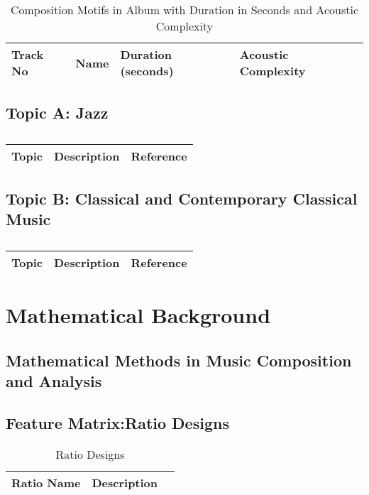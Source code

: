 \begin{table}[H]
	\caption{Composition Motifs in Album with Duration in Seconds and Acoustic Complexity}	
	\begin{tabular}{p{1cm}p{4cm}p{2cm}p{2cm}}
	\hline
	Track No & Name & Duration (seconds) & Acoustic Complexity\\
	\hline
	\hline 
	\end{tabular}
\end{table}

\subsection{Topic A: Jazz}

\centering	
\begin{table}[H]\tiny
	\caption{}	
	\begin{tabular}{r|p{4cm}|l}
		\hline	
		Topic & Description & Reference \\
		\hline 
		\hline 
	\end{tabular}
\end{table}

\subsection{Topic B: Classical and Contemporary Classical Music}

\centering	
\begin{table}[H]\tiny
	\caption{}	
	\begin{tabular}{r|p{4cm}|l}
		\hline	
		Topic & Description & Reference \\
		\hline 
		\hline 
	\end{tabular}
\end{table}

\section{Mathematical Background}

\subsection{Mathematical Methods in Music Composition and Analysis}

\subsection{Feature Matrix:Ratio Designs}

\begin{table}[H]
	\caption{Ratio Designs}	
	\begin{tabular}{p{3cm}p{4cm}p{1cm}}
	\hline
	Ratio Name & Description & \\
	\hline 
	\end{tabular}
\end{table}

